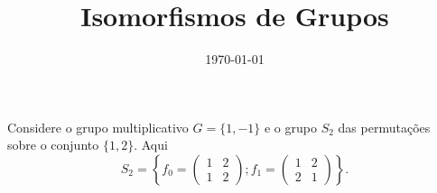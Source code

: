 \documentclass{beamer}
\title{Isomorfismos de Grupos}
\author[\autor]{\autor}
\institute[\instituto]{\instituto}
\date{\today}
\begin{document}
    \begin{frame}
        \maketitle
    \end{frame}


    \begin{frame}
        Considere o grupo multiplicativo $G = \{1, -1\}$ e o grupo $S_2$ das permutações sobre o conjunto $\{1,2\}$. Aqui
        \[
            S_2 = \left\{f_0 = \begin{pmatrix}
                1 & 2\\1 & 2
            \end{pmatrix}; f_1 = \begin{pmatrix}
                1 & 2\\2 & 1
            \end{pmatrix}\right\}.
        \]
    \end{frame}
\end{document}

